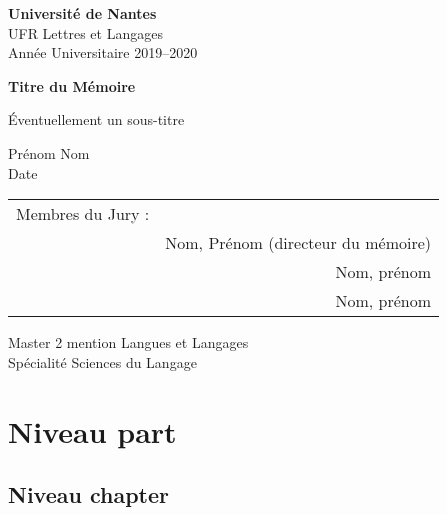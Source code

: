 \documentclass[12pt]{report}
\begin{document}
\begin{titlepage}
  \singlespacing
  \sffamily
  \begin{center}
    {\bfseries\large Université de Nantes}\\
    {UFR Lettres et Langages}\\
    {Année Universitaire 2019--2020}\\
    \vfill

    {\Large\bfseries Titre du Mémoire}

    \vspace{2ex} {\large \'Eventuellement un sous-titre}
     
    \vspace{8ex}
    Prénom Nom\\
    Date

    \begin{flushright}
      \vfill
      \begin{tabular}{lr}
        Membres du Jury : & \\
        & Nom, Prénom (directeur du mémoire)\\
        & Nom, prénom\\
        & Nom, prénom\\
      \end{tabular}
    \end{flushright}
    \vspace{8ex}
    
    { Master 2 mention \og Langues et Langages \fg\\
      Spécialité \og Sciences du Langage \fg}
  \end{center}
\end{titlepage}

\clearpage
\doublespacing
\tableofcontents

\part{Niveau part}

\chapter{Niveau chapter}
\end{document}
